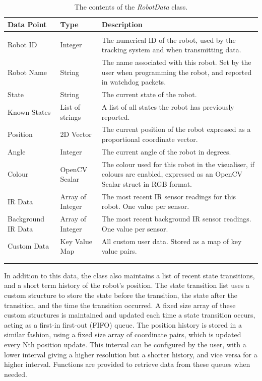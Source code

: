 \begin{longtable}{ l l p{8cm} }
\caption[Robot Data Contents]{The contents of the \textit{RobotData} class.}\\
 \hline
 Data Point & Type & Description\\
 \hline\\
 Robot ID & Integer & The numerical ID of the robot, used by the tracking system and when transmitting data.\\
 Robot Name & String & The name associated with this robot. Set by the user when programming the robot, and reported in watchdog packets. \\
 State & String & The current state of the robot. \\
 Known States & List of strings & A list of all states the robot has previously reported. \\
 Position & 2D Vector & The current position of the robot expressed as a proportional coordinate vector. \\
 Angle & Integer & The current angle of the robot in degrees. \\
 Colour & OpenCV Scalar & The colour used for this robot in the visualiser, if colours are enabled, expressed as an OpenCV Scalar struct in RGB format. \\
 IR Data & Array of Integer & The most recent IR sensor readings for this robot. One value per sensor. \\
 Background IR Data & Array of Integer & The most recent background IR sensor readings. One value per sensor. \\
 Custom Data & Key Value Map & All custom user data. Stored as a map of key value pairs. \\
 \bottomrule\\
 \label{tab:RobotDataContents}
\end{longtable}

In addition to this data, the class also maintains a list of recent state transitions, and a short term history of the robot's position. The state transition list uses a custom structure to store the state before the transition, the state after the transition, and the time the transition occurred. A fixed size array of these custom structures is maintained and updated each time a state transition occurs, acting as a first-in first-out (FIFO) queue. The position history is stored in a similar fashion, using a fixed size array of coordinate pairs, which is updated every Nth position update. This interval can be configured by the user, with a lower interval giving a higher resolution but a shorter history, and vice versa for a higher interval. Functions are provided to retrieve data from these queues when needed.

